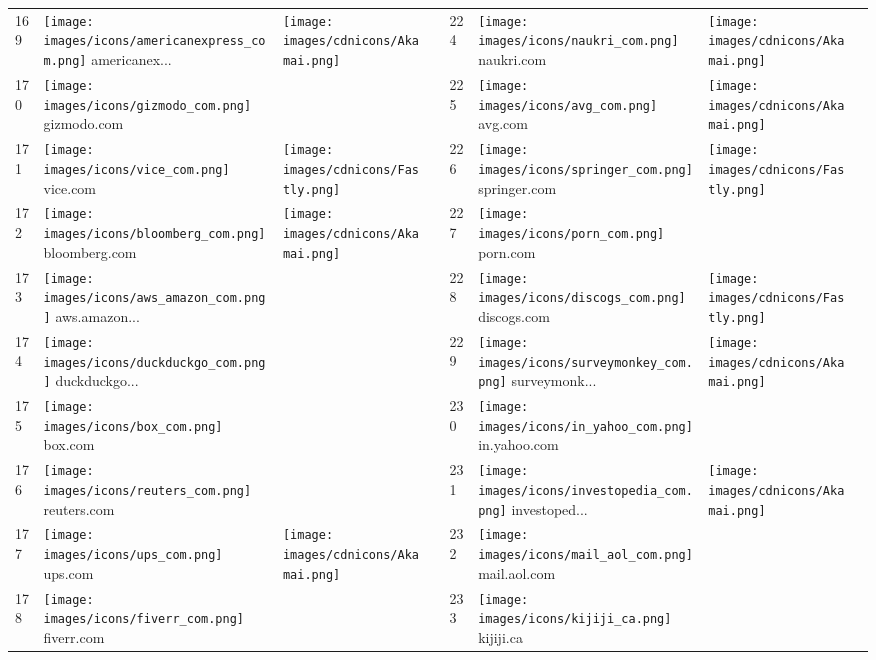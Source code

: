 \begin{table}[tbp]
\begin{tabular}{|llll|llll|}
169 & \texttt{[image: images/icons/americanexpress\_com.png]} americanex... & \texttt{[image: images/cdnicons/Akamai.png]} & & 224 & \texttt{[image: images/icons/naukri\_com.png]} naukri.com & \texttt{[image: images/cdnicons/Akamai.png]} & \\
170 & \texttt{[image: images/icons/gizmodo\_com.png]} gizmodo.com & & & 225 & \texttt{[image: images/icons/avg\_com.png]} avg.com & \texttt{[image: images/cdnicons/Akamai.png]} & \\
171 & \texttt{[image: images/icons/vice\_com.png]} vice.com & \texttt{[image: images/cdnicons/Fastly.png]} & & 226 & \texttt{[image: images/icons/springer\_com.png]} springer.com & \texttt{[image: images/cdnicons/Fastly.png]} & \\
172 & \texttt{[image: images/icons/bloomberg\_com.png]} bloomberg.com & \texttt{[image: images/cdnicons/Akamai.png]} & & 227 & \texttt{[image: images/icons/porn\_com.png]} porn.com & & \\
173 & \texttt{[image: images/icons/aws\_amazon\_com.png]} aws.amazon... & & & 228 & \texttt{[image: images/icons/discogs\_com.png]} discogs.com & \texttt{[image: images/cdnicons/Fastly.png]} & \\
174 & \texttt{[image: images/icons/duckduckgo\_com.png]} duckduckgo... & & & 229 & \texttt{[image: images/icons/surveymonkey\_com.png]} surveymonk... & \texttt{[image: images/cdnicons/Akamai.png]} & \\
175 & \texttt{[image: images/icons/box\_com.png]} box.com & & & 230 & \texttt{[image: images/icons/in\_yahoo\_com.png]} in.yahoo.com & & \\
176 & \texttt{[image: images/icons/reuters\_com.png]} reuters.com & & & 231 & \texttt{[image: images/icons/investopedia\_com.png]} investoped... & \texttt{[image: images/cdnicons/Akamai.png]} & \\
177 & \texttt{[image: images/icons/ups\_com.png]} ups.com & \texttt{[image: images/cdnicons/Akamai.png]} & & 232 & \texttt{[image: images/icons/mail\_aol\_com.png]} mail.aol.com & & \\
178 & \texttt{[image: images/icons/fiverr\_com.png]} fiverr.com & & & 233 & \texttt{[image: images/icons/kijiji\_ca.png]} kijiji.ca & & \\

\end{tabular}
\end{table}
